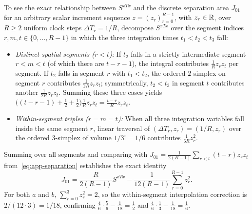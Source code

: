 To see the exact relationship between \(S^{xTx}\) and the discrete separation
area \(J_{01}\) for an arbitrary scalar increment sequence
\(z=(z_r)_{r=0}^{R-1}\), with \(z_r\in\mathbb{R}\), over \(R \geq 2\) uniform clock steps
\(\Delta T_r = 1/R\), decompose \(S^{xTx}\) over the segment indices
\(r, m, t \in \{0, \ldots, R-1\}\) in which the three integration times
\(t_1 < t_2 < t_3\) fall:
\begin{itemize}
\item \emph{Distinct spatial segments (\(r < t\)):} If \(t_2\) falls in a
strictly intermediate segment \(r < m < t\) (of which there are \(t - r - 1\)),
the integral contributes \(\frac{1}{R} z_r z_t\) per segment. If \(t_2\) falls in
segment \(r\) with \(t_1 < t_2\), the ordered \(2\)-simplex on segment \(r\)
contributes \(\frac{1}{2R} z_r z_t\); symmetrically, \(t_2 < t_3\) in segment
\(t\) contributes another \(\frac{1}{2R} z_r z_t\). Summing these three cases
yields \(\bigl((t - r - 1) + \tfrac12 + \tfrac12\bigr)\frac{1}{R} z_r z_t = \frac{t - r}{R} z_r z_t\).
\item \emph{Within-segment triples (\(r = m = t\)):} When all three integration
variables fall inside the same segment \(r\), linear traversal of
\((\Delta T_r, z_r) = (1/R, z_r)\) over the ordered \(3\)-simplex of volume
\(1/3! = 1/6\) contributes \(\frac{1}{6R} z_r^2\).
\end{itemize}
Summing over all segments and comparing with
\(J_{01} = \frac{1}{2(R-1)}\sum_{r < t}(t - r) z_r z_t\) from~\eqref{eq:app-separation}
establishes the exact identity
\begin{equation}\label{eq:discrete-depth-correction}
 J_{01} = \frac{R}{2(R-1)} S^{xTx}
             - \frac{1}{12(R-1)} \sum_{r=0}^{R-1} z_r^2.
\end{equation}
For both \(a\) and \(b\), \(\sum_{r=0}^3 z_r^2 = 2\), so the within-segment
interpolation correction is \(2/(12 \cdot 3) = 1/18\), confirming
\(\frac{4}{6}\cdot\frac{5}{6} - \frac{1}{18} = \frac{1}{2}\) and
\(\frac{4}{6}\cdot\frac{1}{3} - \frac{1}{18} = \frac{1}{6}\).

